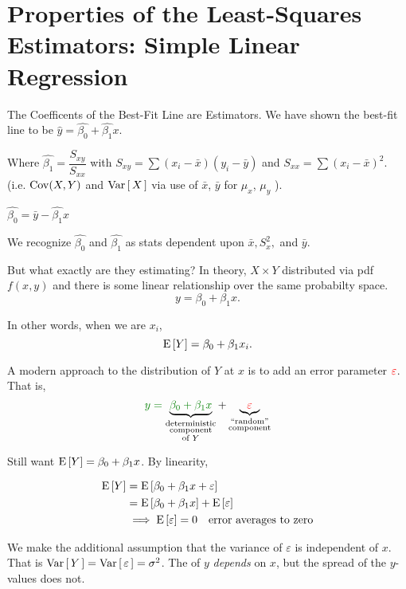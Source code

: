 \section{Properties of the Least-Squares Estimators: Simple Linear Regression}

\nl The Coefficents of the Best-Fit Line are Estimators. We have shown the best-fit line to be $\displaystyle \widehat{y} = \widehat{\beta_0} + \widehat{\beta_1}x$.

\nl Where $\displaystyle \widehat{\beta_1} = \dfrac{S_{xy}}{S_{xx}}$ with $S_{xy} = \sum (x_i - \bar{x})(y_i - \bar{y})$ and $S_{xx} = \sum (x_i - \bar{x})^2$. (i.e. $\operatorname{Cov}(X,Y)$ and $\Vb{X}$ via use of $\bar{x}$, $\bar{y}$ for $\mu_x$, $\mu_y$ ).

\nl $\displaystyle \widehat{\beta_0} = \bar{y} - \widehat{\beta_1}x$

\nl We recognize $\widehat{\beta_0}$ and $\widehat{\beta_1}$ as stats dependent upon $\bar{x}, S_x^2,$ and $\bar{y}$.


\nnl But what exactly are they estimating? In theory, $X \times Y$ distributed via pdf $f(x,y)$ and there is some  linear relationship over the same probabilty space. 
$$y = \beta_0 + \beta_1 x.$$

\nl In other words, when we are  $x_i$,
$$\Eb{Y} = \beta_0 + \beta_1 x_i.$$

\nl A modern approach to the distribution of $Y$ at $x$ is to add an error parameter $\color{red}{\varepsilon}\color{black}$. That is,
$$\setGreen y = \setBlack \underbrace{\setGreen \beta_0 + \beta_1 x}_{\substack{ \text{deterministic}\\\text{component}\\\text{of } Y}}
+ \underbrace{\red{\varepsilon}}_{\substack{\text{\say{random}}\\ \text{component}}}$$

\nl Still want $\Eb{Y} = \beta_0 + \beta_1 x$. By linearity,

\begin{align*}
    \Eb{Y} &= \Eb{\beta_0 + \beta_1x + \varepsilon}\\
    &= \Eb{\beta_0 + \beta_1x} + \Eb{\varepsilon}\\
    &\implies \Eb{\varepsilon} = 0 \quad \text{error averages to zero}
\end{align*}

\nl We make the additional assumption that the variance of $\varepsilon$ is independent of $x$. That is $\Vb{Y} = \Vb{\varepsilon} = \sigma^2$. The  of $y$ \textit{depends} on $x$, but the spread of the $y$-values does not.

